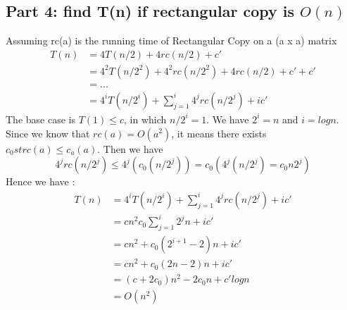 \documentclass{article}
\begin{document}
    \subsection{Part 4: find T(n) if rectangular copy is $O(n)$}
    Assuming rc(a) is the running time of Rectangular Copy on a (a x a) matrix
        \begin{align*}
            T(n) &= 4T(n/2) + 4rc(n/2) + c'\\
            &= 4^2T(n/2^2) + 4^2rc(n/2^2) + 4rc(n/2) + c' + c'\\
            &= ... \\
            &= 4^iT(n/2^i) + \sum_{j=1}^{i}4^jrc(n/2^j) + ic'
        \end{align*}
        The base case is $T(1) \leq c$, in which $n/2^i = 1$. We have $2^i = n$ and $i = log n$. Since we know that $rc(a) = O(a^2)$, it means there exists $c_0 st rc(a) \leq c_a(a)$. Then we have
        \[4^jrc(n/2^j) \leq 4^j(c_0(n/2^j)) = c_0(4^j(n/2^j) = c_0n2^j)\]
        Hence we have :
        \begin{align*}
            T(n) &= 4^iT(n/2^i) + \sum_{j=1}^{i}4^jrc(n/2^j) + ic'\\
            &= cn^2 c_0 \sum_{j=1}^{i} 2^jn + ic'\\
            &= cn^2 + c_0(2^{i+1} - 2)n + ic'\\
            &= cn^2 + c_0(2n - 2)n + ic'\\
            &= (c+2c_0)n^2 - 2c_0n + c'log n\\
            &= O(n^2)
        \end{align*}
\end{document}
